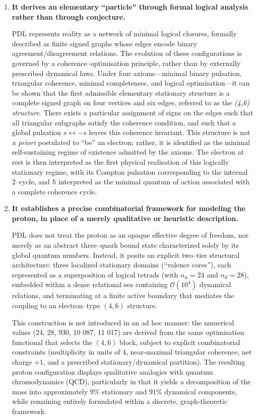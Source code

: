 \documentclass[11pt,a4paper]{article}
\begin{document}
\begin{enumerate}
    \item \textbf{It derives an elementary ``particle'' through formal logical analysis rather than through conjecture.}

    PDL represents reality as a network of minimal logical closures, formally described as finite signed graphs whose edges encode binary agreement/disagreement relations. The evolution of these configurations is governed by a coherence–optimisation principle, rather than by externally prescribed dynamical laws. Under four axioms—minimal binary pulsation, triangular coherence, minimal completeness, and logical optimisation—it can be shown that the first admissible elementary stationary structure is a complete signed graph on four vertices and six edges, referred to as the \emph{(4,6) structure}. There exists a particular assignment of signs on the edges such that all triangular subgraphs satisfy the coherence condition, and such that a global pulsation $s \leftrightarrow -s$ leaves this coherence invariant. This structure is not \emph{a priori} postulated to “be” an electron; rather, it is identified as the minimal self-sustaining regime of existence admitted by the axioms. The electron at rest is then interpreted as the first physical realisation of this logically stationary regime, with its Compton pulsation corresponding to the internal 2–cycle, and $\hbar$ interpreted as the minimal quantum of action associated with a complete coherence cycle.

   \item \textbf{It establishes a precise combinatorial framework for modeling the proton, in place of a merely qualitative or heuristic description.}

    PDL does not treat the proton as an opaque effective degree of freedom, nor merely as an abstract three–quark bound state characterized solely by its global quantum numbers. Instead, it posits an explicit two–tier structural architecture: three localized stationary domains (“valence cores”), each represented as a superposition of logical tetrads (with $n_u = 24$ and $n_d = 28$), embedded within a dense relational sea containing $\mathcal{O}(10^4)$ dynamical relations, and terminating at a finite active boundary that mediates the coupling to an electron–type $(4,6)$ structure. 

    This construction is not introduced in an ad hoc manner: the numerical values (24, 28, 930, 10 087, 11 017) are derived from the same optimisation functional that selects the $(4,6)$ block, subject to explicit combinatorial constraints (multiplicity in units of 4, near-maximal triangular coherence, net charge $+1$, and a prescribed stationary/dynamical partition). The resulting proton configuration displays qualitative analogies with quantum chromodynamics (QCD), particularly in that it yields a decomposition of the mass into approximately $9\%$ stationary and $91\%$ dynamical components, while remaining entirely formulated within a discrete, graph-theoretic framework.


\end{enumerate}
\end{document}
